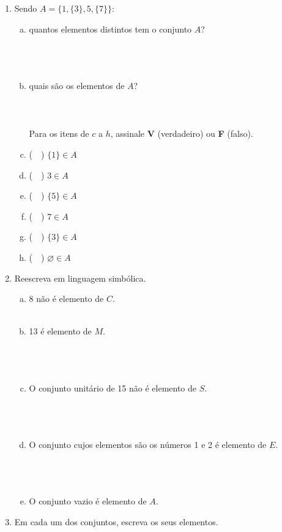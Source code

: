 \documentclass[a4paper,14pt]{article}
\begin{document}
\begin{multicols}{2}
\begin{enumerate}
\begin{enumerate}[a)]
			\end{enumerate}
			\item Sendo $A = \{1, \{3\}, 5, \{7\}\}$:
			\begin{enumerate}[a)]
				\item quantos elementos distintos tem o conjunto $A$? \\\\\\\\
				\item quais são os elementos de $A$? \\\\\\\\
				Para os itens de $c$ a $h$, assinale \textbf{V} (verdadeiro) ou \textbf{F} (falso).
				\item (~~) $\{1\} \in A$
				\item (~~) $3 \in A$
				\item (~~) $\{5\} \in A$
				\item (~~) $7 \in A$
				\item (~~) $\{3\} \in A$
				\item (~~) $\varnothing \in A$
			\end{enumerate}
			\item Reescreva em linguagem simbólica.
			\begin{enumerate}[a)]
				\item 8 não é elemento de $C$. \\\\
				\item 13 é elemento de $M$. \\\\\\\\
				\item O conjunto unitário de 15 não é elemento de $S$. \\\\\\\\
				\item O conjunto cujos elementos são os números 1 e 2 é elemento de $E$. \\\\\\\\
				\item O conjunto vazio é elemento de $A$.
			\end{enumerate}
			\item Em cada um dos conjuntos, escreva os seus elementos.

\end{enumerate}
\end{multicols}
\end{document}
